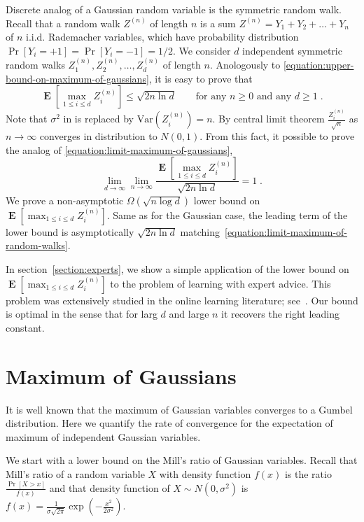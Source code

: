 \documentclass{article}
\DeclareMathOperator*{\Exp}{\mathbf{E}}
\newcommand{\Var}{\mathrm{Var}}
\begin{document}
Discrete analog of a Gaussian random variable is the symmetric random walk. Recall that a random walk $Z^{(n)}$
of length $n$ is a sum $Z^{(n)} = Y_1 + Y_2 + \dots + Y_n$ of $n$ i.i.d. Rademacher variables, which have probability distribution
$\Pr[Y_i = +1] = \Pr[Y_i = -1] = 1/2$. We consider $d$ independent symmetric random walks $Z^{(n)}_1, Z^{(n)}_2, \dots, Z^{(n)}_d$ of length $n$.
Anologously to \eqref{equation:upper-bound-on-maximum-of-gaussians}, it is easy to prove that
\begin{equation}
\label{equation:upper-bound-on-maximum-of-random-walks}
\Exp \left[ \max_{1 \le i \le d} Z^{(n)}_i \right] \le \sqrt{2 n \ln d} \qquad \text{for any $n \ge 0$ and any $d \ge 1$}\; .
\end{equation}
Note that $\sigma^2$ in is replaced by $\Var(Z^{(n)}_i) = n$. By central limit theorem $\frac{Z^{(n)}_i}{\sqrt{n}}$
as $n \to \infty$ converges in distribution to $N(0,1)$. From this fact, it possible to prove
the analog of \eqref{equation:limit-maximum-of-gaussians},
\begin{equation}
\label{equation:limit-maximum-of-random-walks}
\lim_{d \to \infty} \lim_{n \to \infty} \frac{\Exp\left[ \max_{1 \le i \le d} Z^{(n)}_i \right]}{\sqrt{2 n \ln d}} = 1 \; .
\end{equation}
We prove a non-asymptotic $\Omega(\sqrt{n \log d})$ lower bound on $\Exp\left[ \max_{1 \le i \le d} Z^{(n)}_i \right]$.
Same as for the Gaussian case, the leading term of the lower bound is asymptotically $\sqrt{2 n \ln d}$
matching~\eqref{equation:limit-maximum-of-random-walks}.

In section~\ref{section:experts}, we show a simple application of the lower
bound on $\Exp\left[\max_{1 \le i \le d} Z^{(n)}_i \right]$ to the problem of learning with
expert advice.  This problem was extensively studied in the online learning
literature; see~\citep{Cesa-BianchiL06}.  Our bound is optimal in the sense
that for larg $d$ and large $n$ it recovers the right leading constant.

\section{Maximum of Gaussians}
\label{section:maximum-of-gaussians}

It is well known that the maximum of Gaussian variables converges to a Gumbel
distribution. Here we quantify the rate of convergence for the expectation of
maximum of independent Gaussian variables.

We start with a lower bound on the Mill's ratio of Gaussian variables. Recall that Mill's ratio of a random variable $X$
with density function $f(x)$ is the ratio $\frac{\Pr[X > x]}{f(x)}$ and that density function of $X \sim N(0,\sigma^2)$
is $f(x) = \frac{1}{\sigma \sqrt{2 \pi}} \exp\left( - \frac{x^2}{2 \sigma^2} \right)$.
\end{document}
